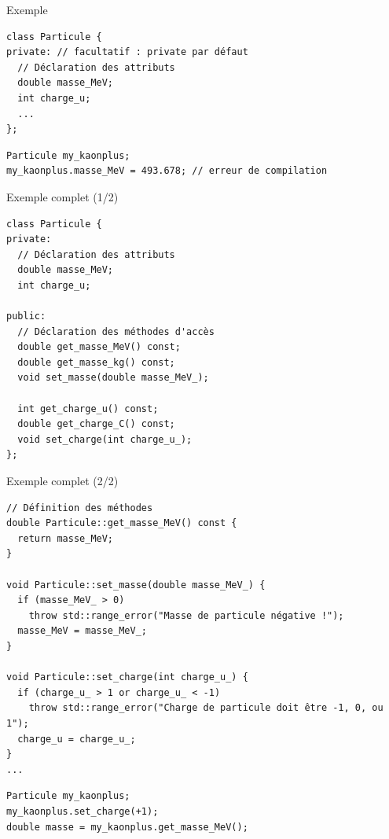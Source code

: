 \documentclass[c]{beamer}
\begin{document}
\begin{frame}[fragile]{Exemple}
\begin{verbatim}
class Particule {
private: // facultatif : private par défaut
  // Déclaration des attributs
  double masse_MeV;
  int charge_u;
  ...
};
\end{verbatim}
\pause
\vspace{1em}
\vspace{1em}
\begin{verbatim}
Particule my_kaonplus;
my_kaonplus.masse_MeV = 493.678; // erreur de compilation
\end{verbatim}
\end{frame}

\begin{frame}[fragile]{Exemple complet (1/2)}
 \begin{verbatim}
class Particule {
private:
  // Déclaration des attributs
  double masse_MeV;
  int charge_u;

public:
  // Déclaration des méthodes d'accès
  double get_masse_MeV() const;
  double get_masse_kg() const;
  void set_masse(double masse_MeV_);

  int get_charge_u() const;
  double get_charge_C() const;
  void set_charge(int charge_u_);
};
\end{verbatim}
\end{frame}


\begin{frame}[fragile]{Exemple complet (2/2)}

\begin{verbatim}
// Définition des méthodes
double Particule::get_masse_MeV() const {
  return masse_MeV;
}

void Particule::set_masse(double masse_MeV_) {
  if (masse_MeV_ > 0)
    throw std::range_error("Masse de particule négative !");
  masse_MeV = masse_MeV_;
}

void Particule::set_charge(int charge_u_) {
  if (charge_u_ > 1 or charge_u_ < -1)
    throw std::range_error("Charge de particule doit être -1, 0, ou 1");
  charge_u = charge_u_;
}
...
\end{verbatim}
\pause
\begin{verbatim}
Particule my_kaonplus;
my_kaonplus.set_charge(+1);
double masse = my_kaonplus.get_masse_MeV();
\end{verbatim}

\end{frame}
\end{document}
